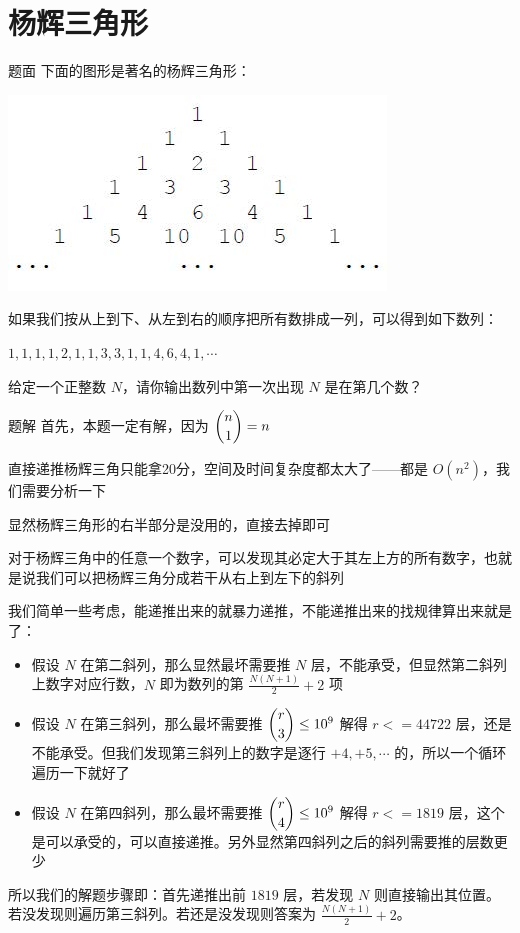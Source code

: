\documentclass{pptt}
\begin{document}
\section{杨辉三角形}

\begin{frame}{题面}
    下面的图形是著名的杨辉三角形：

    \includegraphics[scale=0.5]{images/yh.jpg}

    如果我们按从上到下、从左到右的顺序把所有数排成一列，可以得到如下数列：

    $1, 1, 1, 1, 2, 1, 1, 3, 3, 1, 1, 4, 6, 4, 1, \cdots$

    给定一个正整数 $N$，请你输出数列中第一次出现 $N$ 是在第几个数？
\end{frame}

\begin{frame}{题解}
    首先，本题一定有解，因为 $\dbinom{n}{1}=n$

    直接递推杨辉三角只能拿20分，空间及时间复杂度都太大了——都是 $O(n^2)$，我们需要分析一下

    显然杨辉三角形的右半部分是没用的，直接去掉即可

    对于杨辉三角中的任意一个数字，可以发现其必定大于其左上方的所有数字，也就是说我们可以把杨辉三角分成若干从右上到左下的斜列

    我们简单一些考虑，能递推出来的就暴力递推，不能递推出来的找规律算出来就是了：

\end{frame}

\begin{frame}
    \begin{itemize}
        \item 假设 $N$ 在第二斜列，那么显然最坏需要推 $N$ 层，不能承受，但显然第二斜列上数字对应行数，$N$ 即为数列的第 $\frac{N(N+1)}{2}+2$ 项
        \item 假设 $N$ 在第三斜列，那么最坏需要推 $\dbinom{r}{3} \leq {10}^9$ 解得 $r<=44722$ 层，还是不能承受。但我们发现第三斜列上的数字是逐行 $+4,+5,\cdots$ 的，所以一个循环遍历一下就好了
        \item 假设 $N$ 在第四斜列，那么最坏需要推 $\dbinom{r}{4} \leq {10}^9$ 解得 $r<=1819$ 层，这个是可以承受的，可以直接递推。另外显然第四斜列之后的斜列需要推的层数更少
    \end{itemize}

    所以我们的解题步骤即：首先递推出前 $1819$ 层，若发现 $N$ 则直接输出其位置。若没发现则遍历第三斜列。若还是没发现则答案为 $\frac{N(N+1)}{2}+2$。
\end{frame}
\end{document}
